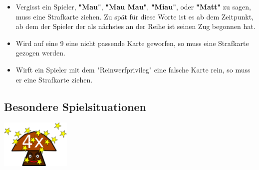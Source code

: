 \documentclass{article}
\begin{document}
\begin{itemize}
\begin{itemize}
\item Vergisst ein Spieler, \textbf{"Mau"}, \textbf{"Mau Mau"}, \textbf{"Miau"}, oder \textbf{"Matt"} zu sagen, muss eine Strafkarte ziehen. Zu spät für diese Worte ist es ab dem Zeitpunkt, ab dem der Spieler der als nächstes an der Reihe ist seinen Zug begonnen hat.

\item Wird auf eine 9 eine nicht passende Karte geworfen, so muss eine Strafkarte gezogen werden.

\item Wirft ein Spieler mit dem "Reinwerfprivileg" eine falsche Karte rein, so muss er eine Strafkarte ziehen.
\end{itemize}         
\end{itemize}
          
\subsection*{Besondere Spielsituationen}
\includegraphics[width=0.25\textwidth]{photos/mushroom.png}
\end{document}
